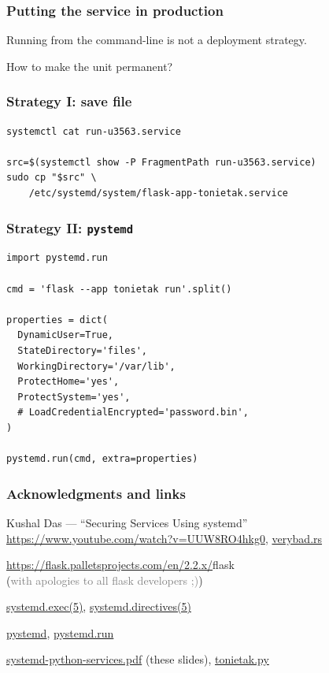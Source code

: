 \documentclass[]{beamer}
\begin{document}
\begin{frame}
  \frametitle{Putting the service in production}

  Running from the command-line is not a deployment strategy.

  How to make the unit permanent?
\end{frame}

\begin{frame}[fragile]
  \frametitle{Strategy I: save file}

  \begin{verbatim}
systemctl cat run-u3563.service

src=$(systemctl show -P FragmentPath run-u3563.service)
sudo cp "$src" \
    /etc/systemd/system/flask-app-tonietak.service
\end{verbatim}
\end{frame}

\begin{frame}[fragile]
  \frametitle{Strategy II: \texttt{pystemd}}

  \begin{verbatim}
import pystemd.run

cmd = 'flask --app tonietak run'.split()

properties = dict(
  DynamicUser=True,
  StateDirectory='files',
  WorkingDirectory='/var/lib',
  ProtectHome='yes',
  ProtectSystem='yes',
  # LoadCredentialEncrypted='password.bin',
)

pystemd.run(cmd, extra=properties)
  \end{verbatim}
\end{frame}

\begin{frame}[fragile]
  \frametitle{Acknowledgments and links}

  Kushal Das — ``Securing Services Using systemd''\\
  \url{https://www.youtube.com/watch?v=UUW8RO4hkg0},
  \href{https://github.com/kushaldas/verybad/blob/main/src/main.rs}{verybad.rs}

  \vfill

  \url{https://flask.palletsprojects.com/en/2.2.x/}{flask}\\
  (\textcolor{gray}{with apologies to all flask developers ;)})

  \vfill

  \href{https://www.freedesktop.org/software/systemd/man/systemd.exec.html}{systemd.exec(5)},
  \href{https://www.freedesktop.org/software/systemd/man/systemd.directives.html}{systemd.directives(5)}

  \vfill

  \href{https://pypi.org/project/pystemd/}{pystemd},
  \href{https://github.com/facebookincubator/pystemd/blob/master/_docs/pystemd.run.md}{pystemd.run}

  \vfill

  \textcolor{teal}{\href{https://raw.githubusercontent.com/keszybz/securing-pyservices-using-systemd/main/systemd-python-services.pdf}{systemd-python-services.pdf}} (these slides),
  \textcolor{teal}{\href{https://github.com/keszybz/securing-pyservices-using-systemd/blob/main/service/tonietak.py}{tonietak.py}}
\end{frame}
\end{document}
